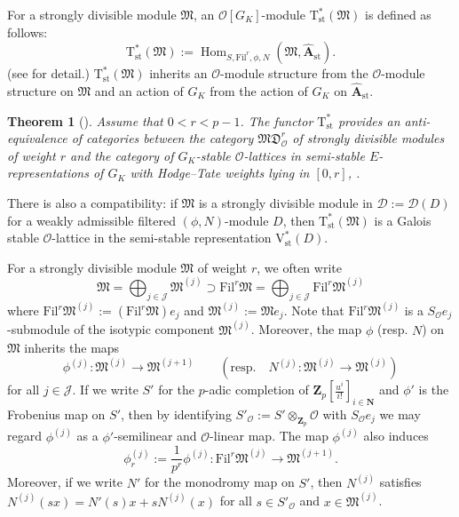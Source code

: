 \documentclass[11pt]{amsart}
\theoremstyle{definition}
\numberwithin{equation}{subsection}
\theoremstyle{plain}
\newtheorem{theo}[equation]{Theorem}
\theoremstyle{plain}
\theoremstyle{plain}
\theoremstyle{plain}
\theoremstyle{plain}
\theoremstyle{plain}
\theoremstyle{plain}
\theoremstyle{plain}
\theoremstyle{plain}
\theoremstyle{plain}
\theoremstyle{plain}
\theoremstyle{plain}
\theoremstyle{definition}
\theoremstyle{definition}
\theoremstyle{definition}
\theoremstyle{remark}
\renewcommand{\(}{\textup{(}}
\renewcommand{\)}{\textup{)}}
\DeclareMathOperator{\Hom}{Hom}
\newcommand{\N}{\mathbf{N}}
\newcommand{\Z}{\mathbf{Z}}
\newcommand{\Tst}{\mathrm{T}_{\mathrm{st}}}
\newcommand{\fM}{\mathfrak{M}}
\newcommand{\Fil}{\mathrm{Fil}}
\newcommand{\cD}{\mathcal{D}}
\newcommand{\cO}{\mathcal{O}}
\newcommand{\cJ}{\mathcal{J}}
\begin{document}
For a strongly divisible module $\fM$, an $\cO[G_{K}]$-module $\Tst^\ast(\fM)$ is defined as follows:
$$\Tst^\ast(\fM):=\Hom_{S,\Fil^r,\phi,N}(\fM,\widehat{\mathbf{A}}_{\mathrm{st}}).$$  (see \cite{Bre99} for detail.) $\Tst^\ast(\fM)$ inherits an $\cO$-module structure from the $\cO$-module structure on $\fM$ and an action of $G_{K}$ from the action of $G_{K}$ on $\widehat{\mathbf{A}}_{\mathrm{st}}$.
\begin{theo}[\cite{Bre99,Liu08,EGH}]
Assume that $0< r< p-1$. The functor $\Tst^\ast$ provides an anti-equivalence of categories between the category $\mathfrak{MD}^{r}_{\cO}$ of strongly divisible modules of weight $r$ and the category of $G_{K}$-stable $\cO$-lattices in semi-stable $E$-representations of $G_{K}$ with Hodge--Tate weights lying in $[0,r]$, .
\end{theo}
There is also a compatibility: if $\fM$ is a strongly divisible module in $\cD:=\cD(D)$ for a weakly admissible filtered $(\phi,N)$-module $D$, then $\Tst^\ast(\fM)$ is a Galois stable $\cO$-lattice in the semi-stable representation $\mathrm{V^{*}_{st}}(D)$.

For a strongly divisible module $\fM$ of weight $r$, we often write
$$\fM=\bigoplus_{j\in\cJ}\fM^{(j)}\supset \Fil^r\fM=\bigoplus_{j\in\cJ} \Fil^r\fM^{(j)}$$
where $\Fil^r\fM^{(j)}:=(\Fil^r\fM) e_j$ and $\fM^{(j)}:=\fM e_j$. Note that $\Fil^r\fM^{(j)}$ is a $S_\cO e_j$-submodule of the isotypic component $\fM^{(j)}$. Moreover, the map $\phi$ (resp. $N$) on $\fM$ inherits the maps
$$\phi^{(j)}:\fM^{(j)}\rightarrow \fM^{(j+1)}\qquad(\mbox{resp.}\quad N^{(j)}:\fM^{(j)}\rightarrow \fM^{(j)})$$
for all $j\in\cJ$. If we write $S'$ for the $p$-adic completion of $\Z_p[\frac{u^i}{i!}]_{i\in\N}$ and $\phi'$ is the Frobenius map on $S'$, then by identifying $S'_\cO:=S'\otimes_{\Z_p}\cO$ with $S_\cO e_j$ we may regard $\phi^{(j)}$ as a $\phi'$-semilinear and $\cO$-linear map. The map $\phi^{(j)}$ also induces $$\phi_r^{(j)}:=\frac{1}{p^r}\phi^{(j)}:\Fil^r\fM^{(j)}\rightarrow\fM^{(j+1)}.$$
Moreover, if we write $N'$ for the monodromy map on $S'$, then $N^{(j)}$ satisfies $N^{(j)}(sx)=N'(s)x+sN^{(j)}(x)$ for all $s\in S'_\cO$ and $x\in\fM^{(j)}$.
\end{document}
